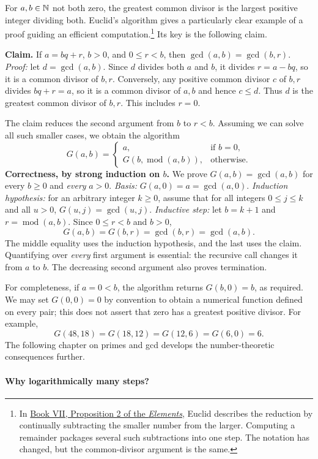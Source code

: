 For $a,b\in\mathbb{N}$ not both zero, the greatest common divisor is the largest
positive integer dividing both. Euclid's algorithm gives a particularly
clear example of a proof guiding an efficient computation.\footnote{In
\href{https://mathcs.clarku.edu/~djoyce/elements/bookVII/propVII2.html}{Book VII,
Proposition 2 of the \emph{Elements}}, Euclid describes the reduction by
continually subtracting the smaller number from the larger. Computing a
remainder packages several such subtractions into one step. The notation
has changed, but the common-divisor argument is the same.} Its key is the
following claim.

\textbf{Claim.} If $a=bq+r$, $b>0$, and $0\leq r<b$, then
$\gcd(a,b)=\gcd(b,r)$.
\emph{Proof:} let $d=\gcd(a,b)$. Since $d$ divides both $a$ and $b$, it
divides $r=a-bq$, so it is a common divisor of $b,r$. Conversely, any
positive common divisor $c$ of $b,r$ divides $bq+r=a$, so it is a common
divisor of $a,b$ and hence $c\leq d$. Thus $d$ is the greatest common
divisor of $b,r$. This includes $r=0$.

The claim reduces the second argument from $b$ to $r<b$. Assuming we can
solve all such smaller cases, we obtain the algorithm
\[
G(a,b)=\begin{cases}
a,&\text{if }b=0,\\
G(b,\operatorname{mod}(a,b)),&\text{otherwise}.
\end{cases}
\]
\textbf{Correctness, by strong induction on $b$.}
We prove $G(a,b)=\gcd(a,b)$ for every $b\geq0$ and \emph{every} $a>0$.
\emph{Basis:} $G(a,0)=a=\gcd(a,0)$.
\emph{Induction hypothesis:} for an arbitrary integer $k\geq0$,
assume that for all integers $0\leq j\leq k$ and all $u>0$,
$G(u,j)=\gcd(u,j)$.
\emph{Inductive step:} let $b=k+1$ and $r=\operatorname{mod}(a,b)$.
Since $0\leq r<b$ and $b>0$,
\[
G(a,b)=G(b,r)=\gcd(b,r)=\gcd(a,b).
\]
The middle equality uses the induction hypothesis, and the last uses the
claim. Quantifying over \emph{every} first argument is essential: the
recursive call changes it from $a$ to $b$. The decreasing second argument
also proves termination.

For completeness, if $a=0<b$, the algorithm returns $G(b,0)=b$, as required.
We may set $G(0,0)=0$ by convention to obtain a numerical function defined on every pair;
this does not assert that zero has a greatest positive divisor.
For example,
\[
G(48,18)=G(18,12)=G(12,6)=G(6,0)=6.
\]
The following chapter on primes and gcd develops the number-theoretic
consequences further.

\paragraph{Why logarithmically many steps?}


